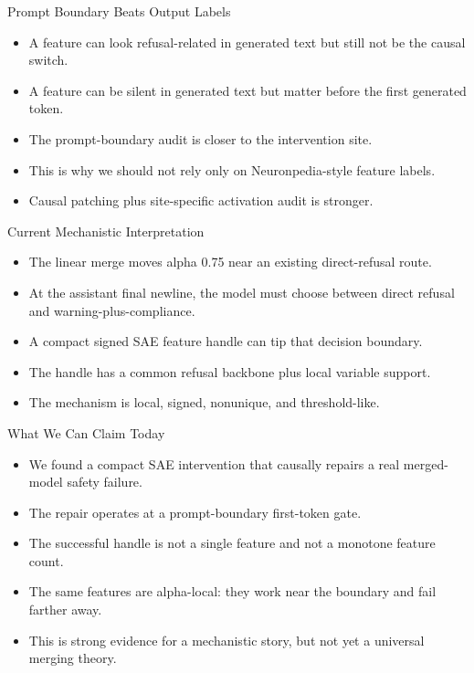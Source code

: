 \documentclass[aspectratio=169]{beamer}
\begin{document}
\begin{frame}{Prompt Boundary Beats Output Labels}
\small
\begin{itemize}
  \item A feature can look refusal-related in generated text but still not be the causal switch.
  \item A feature can be silent in generated text but matter before the first generated token.
  \item The prompt-boundary audit is closer to the intervention site.
  \item This is why we should not rely only on Neuronpedia-style feature labels.
  \item Causal patching plus site-specific activation audit is stronger.
\end{itemize}
\end{frame}

\begin{frame}{Current Mechanistic Interpretation}
\small
\begin{itemize}
  \item The linear merge moves alpha 0.75 near an existing direct-refusal route.
  \item At the assistant final newline, the model must choose between direct refusal and warning-plus-compliance.
  \item A compact signed SAE feature handle can tip that decision boundary.
  \item The handle has a common refusal backbone plus local variable support.
  \item The mechanism is local, signed, nonunique, and threshold-like.
\end{itemize}
\end{frame}

\begin{frame}{What We Can Claim Today}
\small
\begin{itemize}
  \item We found a compact SAE intervention that causally repairs a real merged-model safety failure.
  \item The repair operates at a prompt-boundary first-token gate.
  \item The successful handle is not a single feature and not a monotone feature count.
  \item The same features are alpha-local: they work near the boundary and fail farther away.
  \item This is strong evidence for a mechanistic story, but not yet a universal merging theory.
\end{itemize}
\end{frame}
\end{document}
